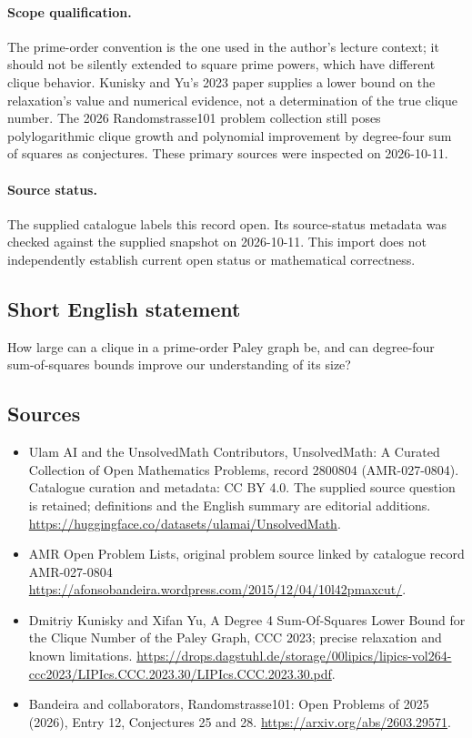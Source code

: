 \documentclass[11pt]{article}
\begin{document}
\paragraph{Scope qualification.}
The prime-order convention is the one used in the author's lecture context; it should not be silently extended to square prime powers, which have different clique behavior. Kunisky and Yu's 2023 paper supplies a lower bound on the relaxation's value and numerical evidence, not a determination of the true clique number. The 2026 Randomstrasse101 problem collection still poses polylogarithmic clique growth and polynomial improvement by degree-four sum of squares as conjectures. These primary sources were inspected on 2026-10-11.
\paragraph{Source status.}
The supplied catalogue labels this record open. Its source-status metadata was checked against the supplied snapshot on 2026-10-11. This import does not independently establish current open status or mathematical correctness.
\subsection{Short English statement}
How large can a clique in a prime-order Paley graph be, and can degree-four sum-of-squares bounds improve our understanding of its size?
\subsection{Sources}
\begin{itemize}
\item[\hypertarget{source:2800804:1}{S1}] Ulam AI and the UnsolvedMath Contributors, UnsolvedMath: A Curated Collection of Open Mathematics Problems, record 2800804 (AMR-027-0804). Catalogue curation and metadata: CC BY 4.0. The supplied source question is retained; definitions and the English summary are editorial additions.
\url{https://huggingface.co/datasets/ulamai/UnsolvedMath}.
\item[\hypertarget{source:2800804:2}{S2}] AMR Open Problem Lists, original problem source linked by catalogue record AMR-027-0804
\url{https://afonsobandeira.wordpress.com/2015/12/04/10l42pmaxcut/}.
\item[\hypertarget{source:2800804:3}{S3}] Dmitriy Kunisky and Xifan Yu, A Degree 4 Sum-Of-Squares Lower Bound for the Clique Number of the Paley Graph, CCC 2023; precise relaxation and known limitations.
\url{https://drops.dagstuhl.de/storage/00lipics/lipics-vol264-ccc2023/LIPIcs.CCC.2023.30/LIPIcs.CCC.2023.30.pdf}.
\item[\hypertarget{source:2800804:4}{S4}] Bandeira and collaborators, Randomstrasse101: Open Problems of 2025 (2026), Entry 12, Conjectures 25 and 28.
\url{https://arxiv.org/abs/2603.29571}.
\end{itemize}
\end{document}
